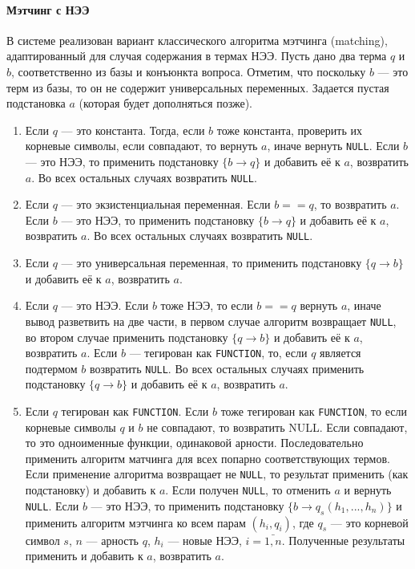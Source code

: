 \paragraph{Мэтчинг с НЭЭ} В системе реализован вариант классического алгоритма мэтчинга (matching), адаптированный для случая содержания в термах НЭЭ. Пусть дано два терма $q$ и $b$, соответственно из базы и конъюнкта вопроса. Отметим, что поскольку $b$ --- это терм из базы, то он не содержит универсальных переменных. Задается пустая подстановка $a$ (которая будет дополняться позже).
\begin{enumerate}
\item Если $q$ --- это константа. Тогда, если $b$ тоже константа, проверить их корневые символы, если совпадают, то вернуть $a$, иначе вернуть \texttt{NULL}. Если $b$ --- это НЭЭ, то применить подстановку $\{b \rightarrow q\}$ и добавить её к $a$, возвратить $a$. Во всех остальных случаях возвратить \texttt{NULL}.

\item Если $q$ --- это экзистенциальная переменная. Если $b==q$, то возвратить $a$. Если $b$ --- это НЭЭ, то применить подстановку $\{b \rightarrow q\}$ и добавить её к $a$, возвратить $a$. Во всех остальных случаях возвратить \texttt{NULL}.

\item Если $q$ --- это универсальная переменная, то применить подстановку $\{q \rightarrow b\}$ и добавить её к $a$, возвратить $a$.

\item Если $q$ --- это НЭЭ. Если $b$ тоже НЭЭ, то если $b==q$ вернуть $a$, иначе вывод разветвить на две части, в первом случае алгоритм возвращает \texttt{NULL}, во втором случае применить подстановку $\{q \rightarrow b\}$ и добавить её к $a$, возвратить $a$. Если $b$ --- тегирован как \texttt{FUNCTION}, то, если $q$ является подтермом $b$ возвратить \texttt{NULL}. Во всех остальных случаях применить подстановку $\{q \rightarrow b\}$ и добавить её к $a$, возвратить $a$.

\item Если $q$ тегирован как \texttt{FUNCTION}. Если $b$ тоже тегирован как \texttt{FUNCTION}, то если корневые символы $q$ и $b$ не совпадают, то возвратить NULL. Если совпадают, то это одноименные функции, одинаковой арности. Последовательно применить алгоритм матчинга для всех попарно соответствующих термов. Если применение алгоритма возвращает не \texttt{NULL}, то результат применить (как подстановку) и добавить к $a$. Если получен \texttt{NULL}, то отменить $a$ и вернуть \texttt{NULL}. Если $b$ --- это НЭЭ, то применить подстановку $\{b \rightarrow q_s(h_1,...,h_n)\}$ и применить алгоритм мэтчинга ко всем парам $(h_i, q_i)$, где $q_s$ --- это корневой символ $s$, $n$ --- арность $q$, $h_i$ --- новые НЭЭ, $i = \bar{1,n}$. Полученные результаты применить и добавить к  $a$, возвратить $a$.
\end{enumerate}

